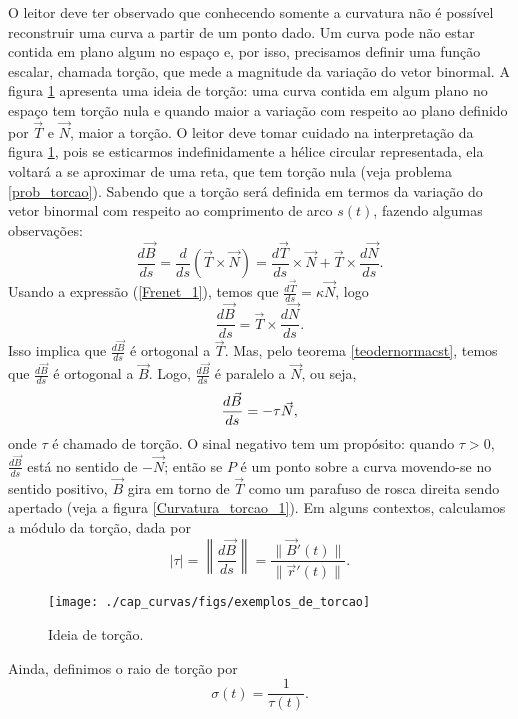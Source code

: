 O leitor deve ter observado que conhecendo somente a curvatura não é possível reconstruir uma curva a partir de um ponto dado. Um curva pode não estar contida em plano algum no espaço e, por isso, precisamos definir uma função escalar, chamada torção, que mede a magnitude da variação do vetor binormal. A figura \ref{torcao} apresenta uma ideia de torção: uma curva contida em algum plano no espaço tem torção nula e quando maior a variação com respeito ao plano definido por $\vec{T}$ e $\vec{N}$, maior a torção. O leitor deve tomar cuidado na interpretação da figura \ref{torcao}, pois se esticarmos indefinidamente a hélice circular representada, ela voltará a se aproximar de uma reta, que tem torção nula (veja problema \ref{prob_torcao}). Sabendo que a torção será definida em termos da variação do vetor binormal com respeito ao comprimento de arco $s(t)$, fazendo algumas observações:
$$
\frac{d\vec{B}}{ds}=\frac{d}{ds}\left(\vec{T}\times\vec{N}\right)=\frac{d\vec{T}}{ds}\times \vec{N}+\vec{T}\times\frac{d\vec{N}}{ds}.
$$
Usando a expressão (\ref{Frenet_1}), temos que $\frac{d\vec{T}}{ds}=\kappa\vec{N}$, logo 
$$
\frac{d\vec{B}}{ds}=\vec{T}\times\frac{d\vec{N}}{ds}.
$$
Isso implica que $\frac{d\vec{B}}{ds}$ é ortogonal a $\vec{T}$. Mas, pelo teorema \ref{teodernormacst}, temos que $\frac{d\vec{B}}{ds}$ é ortogonal a $\vec{B}$. Logo, $\frac{d\vec{B}}{ds}$ é paralelo a $\vec{N}$, ou seja,
\begin{equation}{\label{Frenet_2}}
\frac{d\vec{B}}{ds}=-\tau\vec{N},
\end{equation}
onde $\tau$ é chamado de torção. O sinal negativo tem um propósito: quando $\tau>0$, $\frac{d\vec{B}}{ds}$ está no sentido de $-\vec{N}$; então se $P$ é um ponto sobre a curva movendo-se no sentido positivo, $\vec{B}$ gira em torno de $\vec{T}$ como um parafuso de rosca direita sendo apertado (veja a figura \ref{Curvatura_torcao_1}). Em alguns contextos, calculamos a módulo da torção, dada por
$$
|\tau|=\left\|\frac{d\vec{B}}{ds}\right\|=\frac{\|\vec{B}'(t)\|}{\|\vec{r}'(t)\|}.
$$


\begin{figure}
\begin{center}
    \texttt{[image: ./cap\_curvas/figs/exemplos\_de\_torcao]}
 \caption{Ideia de torção.}\label{torcao}
  \end{center}
\end{figure}



Ainda, definimos o raio de torção por
$$
\sigma(t)=\frac{1}{\tau(t)}.
$$


